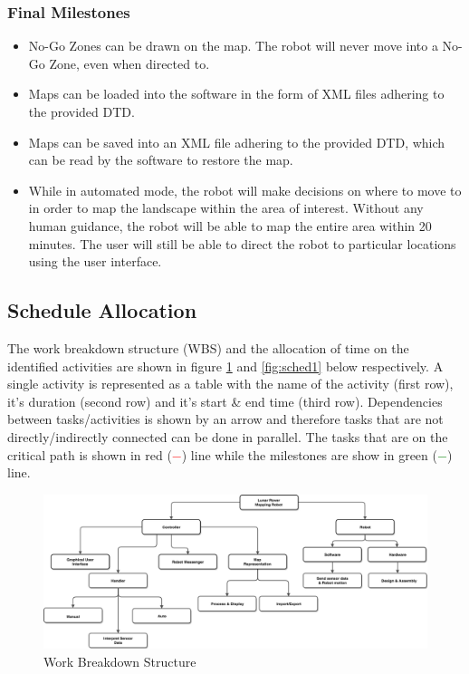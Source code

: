 \documentclass[12pt,a4paper]{article}
\begin{document}
    \subsubsection{Final Milestones}
    \begin{itemize}
        \item No-Go Zones can be drawn on the map. The robot will never move into a No-Go Zone, even when directed to.
    	\item Maps can be loaded into the software in the form of XML files adhering to the provided DTD.
        \item Maps can be saved into an XML file adhering to the provided DTD, which can be read by the software to restore the map.
        \item While in automated mode, the robot will make decisions on where to move to in order to map the landscape within the area of interest. Without any human guidance, the robot will be able to map the entire area within 20 minutes. The user will still be able to direct the robot to particular locations using the user interface.
    \end{itemize}
	
	\subsection{Schedule Allocation}
	The work breakdown structure (WBS) and the allocation of time on the identified activities are shown in figure \ref{fig:wbs} and \ref{fig:sched1} below respectively. A single activity is represented as a table with the name of the activity (first row), it's duration (second row) and it's start \& end time (third row). Dependencies between tasks/activities is shown by an arrow and therefore tasks that are not directly/indirectly connected can be done in parallel. The tasks that are on the critical path is shown in red (\textcolor{red}{$-$}) line while the milestones are show in green (\textcolor{green}{$-$}) line.
    \begin{figure}[h!t]
    	\caption{Work Breakdown Structure}
		\label{fig:wbs}
		\centering
		\includegraphics[scale=0.38, angle=90]{WBS}
	\end{figure}
    
\end{document}
